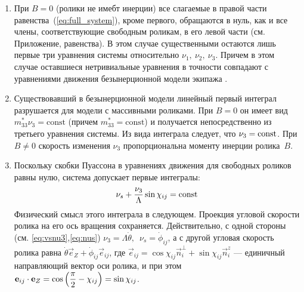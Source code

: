\begin{enumerate}[wide]
    \item При $B = 0$ (ролики не имебт инерции) все слагаемые в правой части равенства~(\ref{eq:full_system}), кроме первого, обращаются в нуль, как и все члены, соответствующие свободным роликам, в его левой части (см. Приложение, равенства). В этом случае существенными остаются лишь первые три уравнения системы относительно $\nu_1,\ \nu_2,\ \nu_3$. Причем в этом случае оставшиеся нетривиальные уравнения в точности совпадают с уравнениями движения безынерционной модели экипажа \cite{ZobovaTatarinovPMM}.
    \item Существовавший в безынерционной модели линейный первый интеграл \cite{ZobovaTatarinovPMM} разрушается для модели с массивными роликами. При $B = 0$ он имеет вид $m_{33}^*\nu_3 = \mathrm{const}$ (причем $m^*_{33} = \mathrm{const}$) и получается непосредственно из третьего уравнения системы. Из вида интеграла следует, что $\nu_3 = \mathrm{const}$. При $B \neq 0$ скорость изменения $\nu_3$ пропорциональна моменту инерции ролика~$B$.
    \item Поскольку скобки Пуассона в уравнениях движения для свободных роликов равны нулю, система допускает первые интегралы:
    \begin{equation}\label{int_free_roller}
        \nu_s + \displaystyle\frac{\displaystyle \nu_3}{\displaystyle \Lambda}\sin\chi_{ij} = \mathrm{const}
    \end{equation}
    Физический смысл этого интеграла в следующем. Проекция угловой скорости ролика на его ось вращения сохраняется. Действительно, с одной стороны (см. \ref{eq:vsnu3},\ref{eq:nus}) $\nu_3 = \Lambda\dot{\theta}, \enspace \nu_s = \dot{\phi}_{ij}$, а с другой угловая скорость ролика равна $\dot{\theta}\vec{e}_Z + \dot{\phi}_{ij}\vec{e}_{ij}$, где $\vec{e}_{ij} = \cos\chi_{ij}\vec{n}_i^\perp + \sin\chi_{ij}\vec{n}_i^z$ --- единичный направляющий вектор оси ролика, и при этом $\boldsymbol{\mathbf{e}}_{ij} \cdot \boldsymbol{\mathbf{e}}_Z = \cos\left(\displaystyle\frac{\displaystyle \pi}{\displaystyle 2} - \chi_{ij}\right) = \sin\chi_{ij}$.

\end{enumerate}
